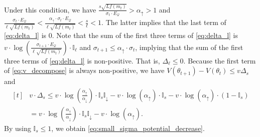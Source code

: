 \documentclass[journal]{IEEEtran}
\renewcommand{\leq}{\leqslant} %
\theoremstyle{definition}
\newcommand{\yohe}[1]{{\color{cyan}Y.A.: #1}}
\newcommand{\indup}{\mathbb{I}_{\uparrow}}
\newcommand{\inddown}{\mathbb{I}_{\downarrow}}
\newcommand{\inds}{\mathbb{I}_{s}}
\newcommand{\indl}{\mathbb{I}_{\ell}}
\newcommand{\aup}{\alpha_{\uparrow}}
\newcommand{\adown}{\alpha_{\downarrow}}
\begin{document}
Under this condition, 
we have $\frac{s\sqrt{Lf(m_t)}}{\sigma_t \cdot E_\mathcal{Q}}>\aup>1$
and $\frac{\sigma_t \cdot E_\mathcal{Q}}{\ell\sqrt{Lf(m_t)}} < \frac{\aup \cdot \sigma_t \cdot E_\mathcal{Q}}{\ell\sqrt{Lf(m_t)}}<\frac{s}{\ell}<1$.
The latter implies that the last term of \eqref{eq:delta_l} is $0$.
Note that the sum of the first three terms of \eqref{eq:delta_l} is $v\cdot\log\left(\frac{\sigma_{t+1}\cdot E_\mathcal{Q}}{\ell\sqrt{ Lf(m_{t})}}\right)\cdot\indl$ and $\sigma_{t+1} \leq \aup \cdot \sigma_t$, implying that the sum of the first three terms of \eqref{eq:delta_l} is non-positive. That is, $\Delta_{\ell} \leq 0$. 
Because the first term of \eqref{eq:v_decompose} is always non-positive, we have $V(\theta_{t+1}) - V(\theta_t) \leq v \Delta_s$ and
\begin{equation}
\begin{aligned}[t]
&v \cdot\Delta_s
\leq
v\cdot\log\left(\frac{\aup}{\adown}\right)\cdot\inds\inddown
- v\cdot\log\left(\aup\right)\cdot\inds
- v \cdot \log \left(\aup\right) \cdot (1 - \inds)
\\
&=
v\cdot\log\left(\frac{\aup}{\adown}\right)\cdot\inds\inddown
- v \cdot \log \left(\aup\right).
\end{aligned}
\end{equation}
By using $\inds \leq 1$, we obtain \eqref{eq:small_sigma_potential_decrease}.
\end{document}
